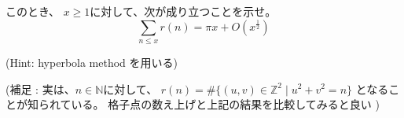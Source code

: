 \documentclass[12pt,b5paper]{ltjsarticle}
\begin{document}
\begin{enumerate}
      このとき、
      $x\geq 1$に対して、次が成り立つことを示せ。
      \begin{equation}
       \sum_{n\leq x} r(n) = \pi x + O(x^{\frac{1}{2}})
      \end{equation}

      (Hint: hyperbola method を用いる)

      (補足 :
      実は、$n\in\mathbb{N}$に対して、
      $r(n) = \# \{ (u,v) \in\mathbb{Z}^2 \mid u^2+v^2=n \}$
      となることが知られている。
      格子点の数え上げと上記の結果を比較してみると良い
      )

\end{enumerate}

\hrulefill
\end{document}
